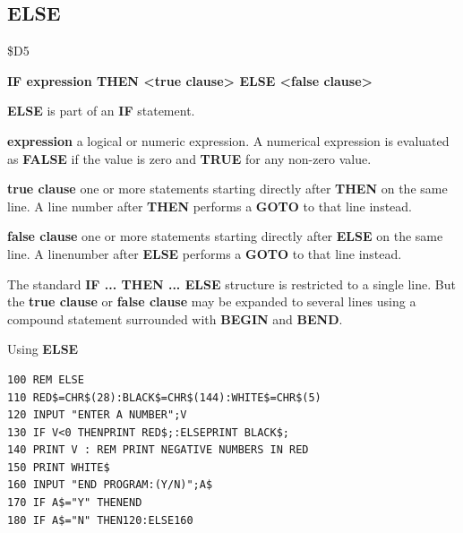 \subsection{ELSE}
\begin{description}[leftmargin=2cm,style=nextline]
\item [Token:] \$D5
\item [Format:] {\bf IF expression THEN <true clause> ELSE <false clause>}
\item [Usage:] {\bf ELSE} is part of an {\bf IF}
               statement.

               {\bf expression} a logical or numeric expression.
               A numerical expression is evaluated as {\bf FALSE}
               if the value is zero and {\bf TRUE} for any non-zero
               value.

               {\bf true clause} one or more statements starting
               directly after {\bf THEN} on the same line.
               A line number after {\bf THEN} performs a
               {\bf GOTO} to that line instead.

               {\bf false clause} one or more statements starting
               directly after {\bf ELSE} on the same line.
               A linenumber after {\bf ELSE} performs a
               {\bf GOTO} to that line instead.

\item [Remarks:]
               The standard {\bf IF ... THEN ... ELSE} structure
               is restricted to a single line. But the {\bf true clause}
               or {\bf false clause} may be expanded to several lines
               using a compound statement surrounded with
               {\bf BEGIN} and {\bf BEND}.
\item [Example:]
                Using {\bf ELSE}
\begin{tcolorbox}[colback=black,coltext=white]
\verbatimfont{\codefont}
\begin{verbatim}
100 REM ELSE
110 RED$=CHR$(28):BLACK$=CHR$(144):WHITE$=CHR$(5)
120 INPUT "ENTER A NUMBER";V
130 IF V<0 THENPRINT RED$;:ELSEPRINT BLACK$;
140 PRINT V : REM PRINT NEGATIVE NUMBERS IN RED
150 PRINT WHITE$
160 INPUT "END PROGRAM:(Y/N)";A$
170 IF A$="Y" THENEND
180 IF A$="N" THEN120:ELSE160
\end{verbatim}
\end{tcolorbox}
\end{description}



